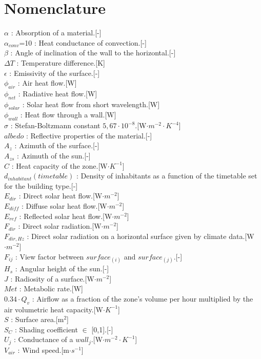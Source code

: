 \documentclass[runningheads]{llncs}
\begin{document}
\section*{Nomenclature}

\begin{multicols}{2}
$\alpha$ : Absorption of a material.\hfill[-]\\
$\alpha_{conv}$=10 : Heat conductance of convection.\hfill[-]\\
$\beta$ : Angle of inclination of the wall to the horizontal.\hfill[-]\\
$\Delta T$ : Temperature difference.\hfill[K]\\
$\epsilon$ : Emissivity of the surface.\hfill[-]\\
$\phi_{air}$ : Air heat flow.\hfill[W]\\
$\phi_{net}$ : Radiative heat flow.\hfill[W]\\
$\phi_{solar}$ : Solar heat flow from short wavelength.\hfill[W]\\
$\phi_{wall}$ : Heat flow through a wall.\hfill[W]\\
$\sigma$ : Stefan-Boltzmann constant $5,67\cdot10^{-8}$.\hfill[W$\cdot m^{-2}\cdot K^{-4}$]\\
$albedo$ : Reflective properties of the material.\hfill[-]\\
$A_z$ : Azimuth of the surface.\hfill[-]\\
$A_{zs}$ : Azimuth of the sun.\hfill[-]\\
$C$ : Heat capacity of the zone.\hfill[W$\cdot K^{-1}$]\\
$d_{inhabitant}(timetable)$ : Density of inhabitants as a function of the timetable set for the building type.\hfill[-]\\
$E_{dir}$ : Direct solar heat flow.\hfill[W$\cdot m^{-2}$]\\
$E_{diff}$ : Diffuse solar heat flow.\hfill[W$\cdot m^{-2}$]\\
$E_{ref}$ : Reflected solar heat flow.\hfill[W$\cdot m^{-2}$]\\
$F_{dir}$ : Direct solar radiation.\hfill[W$\cdot m^{-2}$]\\
$F_{dir,Hz}$ : Direct solar radiation on a horizontal surface given by climate data.\hfill[W$\cdot m^{-2}$]\\
$F_{ij}$ : View factor between $surface_{(i)}$ and $surface_{(j)}$.\hfill[-]\\
$H_s$ : Angular height of the sun.\hfill[-]\\
$J$ : Radiosity of a surface.\hfill[W$\cdot m^{-2}$]\\
$Met$ : Metabolic rate.\hfill[W]\\
$0.34\cdot Q_v$ : Airflow as a fraction of the zone's volume per hour multiplied by the air volumetric heat capacity.\hfill[W$\cdot K^{-1}$]\\
$S$ : Surface area.\hfill[m$^2$]\\
$S_C$ : Shading coefficient $\in$ [0,1].\hfill[-]\\
$U_j$ : Conductance of a $wall_j$.\hfill[W$\cdot m^{-2}\cdot K^{-1}$]\\
$V_{air}$ : Wind speed.\hfill[m$\cdot s^{-1}$]
\end{multicols}



\end{document}
